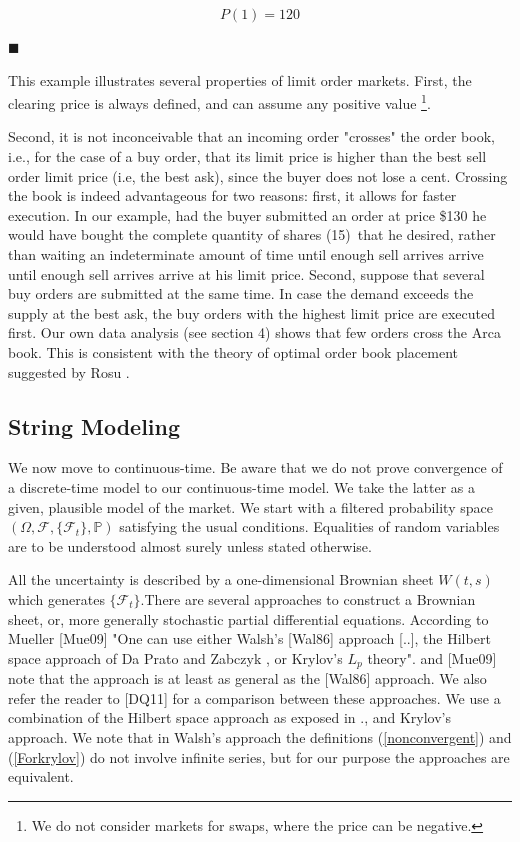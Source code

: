 \documentclass{article}
\begin{document}
\begin{equation*}
P(1)=120
\end{equation*}

$\blacksquare $

This example illustrates several properties of limit order markets. First,
the clearing price is always defined, and can assume any positive value%
\footnote{%
We do not consider markets for swaps, where the price can be negative.}.

Second, it is not inconceivable that an incoming order "crosses" the order
book, i.e., for the case of a buy order, that its limit price is higher than
the best sell order limit price (i.e, the best ask), since the buyer does
not lose a cent. Crossing the book is indeed advantageous for two reasons:
first, it allows for faster execution. In our example, had the buyer
submitted an order at price \$130 he would have bought the complete quantity
of shares (15)\ that he desired, rather than waiting an indeterminate amount
of time until enough sell arrives arrive until enough sell arrives arrive at
his limit price. Second, suppose that several buy orders are submitted at
the same time. In case the demand exceeds the supply at the best ask, the
buy orders with the highest limit price are executed first. Our own data
analysis (see section 4) shows that few orders cross the Arca book. This is
consistent with the theory of optimal order book placement suggested by Rosu 
\cite{Ros09}.

\bigskip

\subsection{String Modeling}

We now move to continuous-time. Be aware that we do not prove convergence of
a discrete-time model to our continuous-time model. We take the latter as a
given, plausible model of the market. We start with a filtered probability
space $(\Omega ,\mathcal{F},\{\mathcal{F}_{t}\},\mathbb{P})$ satisfying the
usual conditions. Equalities of random variables are to be understood almost
surely unless stated otherwise.

All the uncertainty is described by a one-dimensional Brownian sheet $W(t,s)$
which generates $\{\mathcal{F}_{t}\}$.There are several approaches to
construct a Brownian sheet, or, more generally stochastic partial
differential equations. According to Mueller [Mue09] "One can use either
Walsh's [Wal86] approach [..], the Hilbert space approach of Da Prato and
Zabczyk \cite{DPZ92}, or Krylov's \cite{Kry09} $L_{p}$ theory". \cite{DPZ92}
and [Mue09] note that the approach is at least as general as the [Wal86]
approach. We also refer the reader to [DQ11] for a comparison between these
approaches. We use a combination of the Hilbert space approach as exposed in 
\cite{CT06}., and Krylov's approach. We note that in Walsh's approach the
definitions (\ref{nonconvergent}) and (\ref{Forkrylov}) do not involve
infinite series, but for our purpose the approaches are equivalent.
\end{document}
